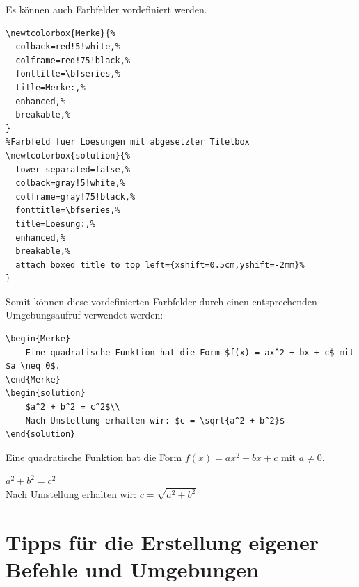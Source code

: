 Es können auch Farbfelder vordefiniert werden. 

\begin{lstlisting}[style=latex]
%Farbfeld fuer Merksaetze
\newtcolorbox{Merke}{%
  colback=red!5!white,%
  colframe=red!75!black,%
  fonttitle=\bfseries,%
  title=Merke:,%
  enhanced,%
  breakable,%
}
%Farbfeld fuer Loesungen mit abgesetzter Titelbox
\newtcolorbox{solution}{%
  lower separated=false,%
  colback=gray!5!white,%
  colframe=gray!75!black,%
  fonttitle=\bfseries,%
  title=Loesung:,%
  enhanced,%
  breakable,%
  attach boxed title to top left={xshift=0.5cm,yshift=-2mm}%
}
\end{lstlisting}

Somit können diese vordefinierten Farbfelder durch einen entsprechenden Umgebungsaufruf verwendet werden:

\begin{lstlisting}[style=latex]
\begin{Merke}
	Eine quadratische Funktion hat die Form $f(x) = ax^2 + bx + c$ mit $a \neq 0$.
\end{Merke}
\begin{solution}
	$a^2 + b^2 = c^2$\\
	Nach Umstellung erhalten wir: $c = \sqrt{a^2 + b^2}$
\end{solution}
\end{lstlisting}

\begin{ausgabe}
	\begin{alert}
		Eine quadratische Funktion hat die Form $f(x) = ax^2 + bx + c$ mit $a \neq 0$.
	\end{alert}
	\begin{solution}
		$a^2 + b^2 = c^2$\\
	Nach Umstellung erhalten wir: $c = \sqrt{a^2 + b^2}$
	\end{solution}
\end{ausgabe}


\section{Tipps für die Erstellung eigener Befehle und Umgebungen}

